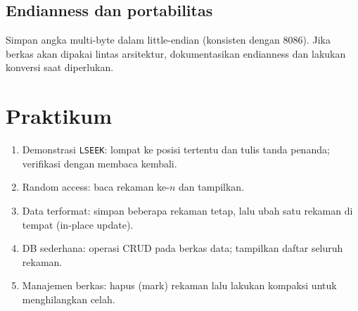 \subsection{Endianness dan portabilitas}
Simpan angka multi-byte dalam little-endian (konsisten dengan 8086). Jika berkas akan dipakai lintas arsitektur, dokumentasikan endianness dan lakukan konversi saat diperlukan. \cite{wiki_endianness}

\section{Praktikum}
\begin{enumerate}
  \item Demonstrasi \texttt{LSEEK}: lompat ke posisi tertentu dan tulis tanda penanda; verifikasi dengan membaca kembali.
  \item Random access: baca rekaman ke-\(n\) dan tampilkan.
  \item Data terformat: simpan beberapa rekaman tetap, lalu ubah satu rekaman di tempat (in-place update).
  \item DB sederhana: operasi CRUD pada berkas data; tampilkan daftar seluruh rekaman.
  \item Manajemen berkas: hapus (mark) rekaman lalu lakukan kompaksi untuk menghilangkan celah.
\end{enumerate}


